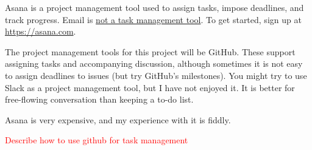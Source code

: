 Asana is a project management tool used to assign tasks, impose deadlines, and track progress.
Email is \href{https://facilethings.com/blog/en/your-email-is-not-a-todo-list}{not a task management tool}.
To get started, sign up at \url{https://asana.com}.

The project management tools for this project will be GitHub.
These support assigning tasks and accompanying discussion,
although sometimes it is not easy to assign deadlines to issues (but try GitHub's milestones). 
You might try to use Slack as a project management tool, but I have not enjoyed it.
It is better for free-flowing conversation than keeping a to-do list.

Asana is very expensive, and my experience with it is fiddly. 

\textcolor{red}{Describe how to use github for task management}